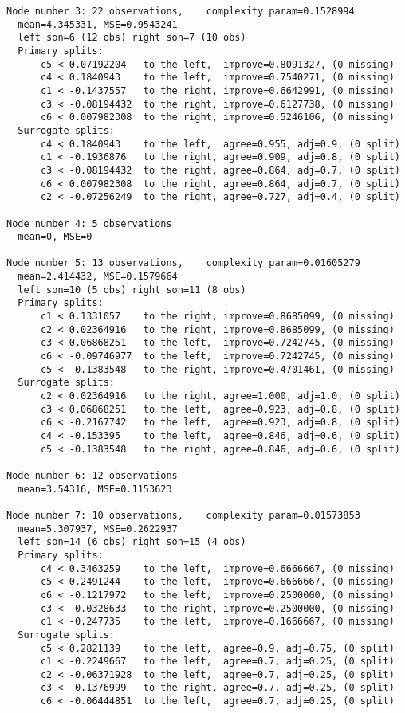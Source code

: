 \documentclass[]{article}
\begin{document}
\begin{verbatim}
Node number 3: 22 observations,    complexity param=0.1528994
  mean=4.345331, MSE=0.9543241 
  left son=6 (12 obs) right son=7 (10 obs)
  Primary splits:
      c5 < 0.07192204   to the left,  improve=0.8091327, (0 missing)
      c4 < 0.1840943    to the left,  improve=0.7540271, (0 missing)
      c1 < -0.1437557   to the right, improve=0.6642991, (0 missing)
      c3 < -0.08194432  to the right, improve=0.6127738, (0 missing)
      c6 < 0.007982308  to the right, improve=0.5246106, (0 missing)
  Surrogate splits:
      c4 < 0.1840943    to the left,  agree=0.955, adj=0.9, (0 split)
      c1 < -0.1936876   to the right, agree=0.909, adj=0.8, (0 split)
      c3 < -0.08194432  to the right, agree=0.864, adj=0.7, (0 split)
      c6 < 0.007982308  to the right, agree=0.864, adj=0.7, (0 split)
      c2 < -0.07256249  to the right, agree=0.727, adj=0.4, (0 split)

Node number 4: 5 observations
  mean=0, MSE=0 

Node number 5: 13 observations,    complexity param=0.01605279
  mean=2.414432, MSE=0.1579664 
  left son=10 (5 obs) right son=11 (8 obs)
  Primary splits:
      c1 < 0.1331057    to the right, improve=0.8685099, (0 missing)
      c2 < 0.02364916   to the right, improve=0.8685099, (0 missing)
      c3 < 0.06868251   to the left,  improve=0.7242745, (0 missing)
      c6 < -0.09746977  to the left,  improve=0.7242745, (0 missing)
      c5 < -0.1383548   to the right, improve=0.4701461, (0 missing)
  Surrogate splits:
      c2 < 0.02364916   to the right, agree=1.000, adj=1.0, (0 split)
      c3 < 0.06868251   to the left,  agree=0.923, adj=0.8, (0 split)
      c6 < -0.2167742   to the left,  agree=0.923, adj=0.8, (0 split)
      c4 < -0.153395    to the left,  agree=0.846, adj=0.6, (0 split)
      c5 < -0.1383548   to the right, agree=0.846, adj=0.6, (0 split)

Node number 6: 12 observations
  mean=3.54316, MSE=0.1153623 

Node number 7: 10 observations,    complexity param=0.01573853
  mean=5.307937, MSE=0.2622937 
  left son=14 (6 obs) right son=15 (4 obs)
  Primary splits:
      c4 < 0.3463259    to the left,  improve=0.6666667, (0 missing)
      c5 < 0.2491244    to the left,  improve=0.6666667, (0 missing)
      c6 < -0.1217972   to the left,  improve=0.2500000, (0 missing)
      c3 < -0.0328633   to the right, improve=0.2500000, (0 missing)
      c1 < -0.247735    to the left,  improve=0.1666667, (0 missing)
  Surrogate splits:
      c5 < 0.2821139    to the left,  agree=0.9, adj=0.75, (0 split)
      c1 < -0.2249667   to the left,  agree=0.7, adj=0.25, (0 split)
      c2 < -0.06371928  to the left,  agree=0.7, adj=0.25, (0 split)
      c3 < -0.1376999   to the right, agree=0.7, adj=0.25, (0 split)
      c6 < -0.06444851  to the left,  agree=0.7, adj=0.25, (0 split)


\end{verbatim}
\end{document}

